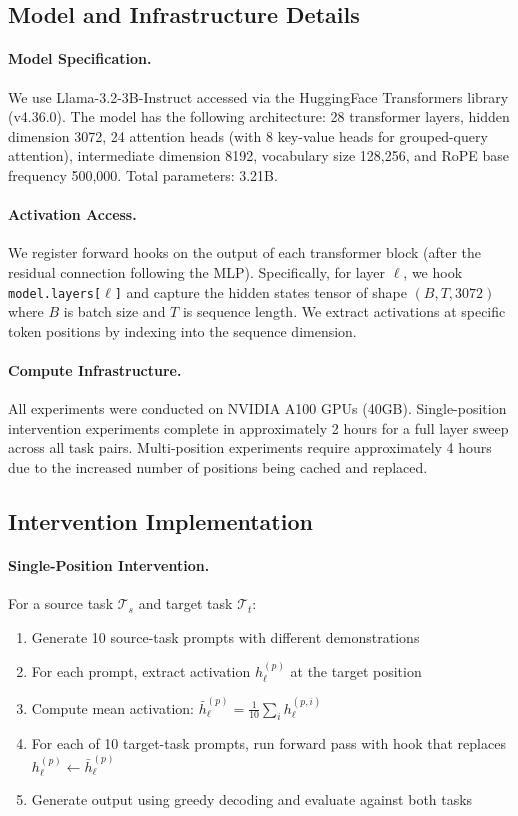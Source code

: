 \documentclass{article}
\begin{document}
\subsection{Model and Infrastructure Details}

\paragraph{Model Specification.} We use Llama-3.2-3B-Instruct accessed via the HuggingFace Transformers library (v4.36.0). The model has the following architecture: 28 transformer layers, hidden dimension 3072, 24 attention heads (with 8 key-value heads for grouped-query attention), intermediate dimension 8192, vocabulary size 128,256, and RoPE base frequency 500,000. Total parameters: 3.21B.

\paragraph{Activation Access.} We register forward hooks on the output of each transformer block (after the residual connection following the MLP). Specifically, for layer $\ell$, we hook \texttt{model.layers[$\ell$]} and capture the hidden states tensor of shape $(B, T, 3072)$ where $B$ is batch size and $T$ is sequence length. We extract activations at specific token positions by indexing into the sequence dimension.

\paragraph{Compute Infrastructure.} All experiments were conducted on NVIDIA A100 GPUs (40GB). Single-position intervention experiments complete in approximately 2 hours for a full layer sweep across all task pairs. Multi-position experiments require approximately 4 hours due to the increased number of positions being cached and replaced.

\subsection{Intervention Implementation}

\paragraph{Single-Position Intervention.} For a source task $\mathcal{T}_s$ and target task $\mathcal{T}_t$:
\begin{enumerate}
    \item Generate 10 source-task prompts with different demonstrations
    \item For each prompt, extract activation $h_\ell^{(p)}$ at the target position
    \item Compute mean activation: $\bar{h}_\ell^{(p)} = \frac{1}{10}\sum_i h_\ell^{(p,i)}$
    \item For each of 10 target-task prompts, run forward pass with hook that replaces $h_\ell^{(p)} \leftarrow \bar{h}_\ell^{(p)}$
    \item Generate output using greedy decoding and evaluate against both tasks
\end{enumerate}
\end{document}
